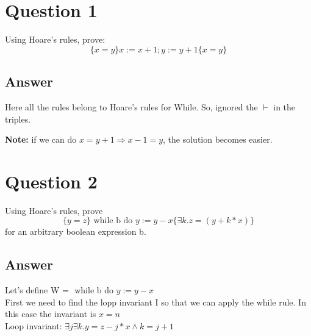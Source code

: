 \documentclass[11pt]{article}
\begin{document}
  \section{Question 1}
  Using Hoare's rules, prove:
  $$\{x = y\} x:= x+1; y:=y+1 \{x = y\}$$
  \subsection{Answer}
  Here all the rules belong to Hoare's rules for While. So, ignored the $\vdash$ in the triples.
  \begin{prooftree}
  \end{prooftree}
  \textbf{Note:} if we can do $x = y +1 \Rightarrow x-1=y$, the solution becomes easier.
  \begin{prooftree}
  \end{prooftree}
  \section{Question 2}
  Using Hoare’s rules, prove
  $$ \{ y = z \}  \textrm{ while b do } y := y - x \{ \exists k. z = (y + k * x)\} $$
  for an arbitrary boolean expression b.
  \subsection{Answer}
  Let's define W = $\textrm{ while b do } y := y - x $ \\
  First we need to find the lopp invariant I so that we can apply the while rule. In this case the invariant is $x = n$ \\
  Loop invariant: $\exists j\exists k. y = z - j*x \wedge k = j + 1$ \\
\end{document}
